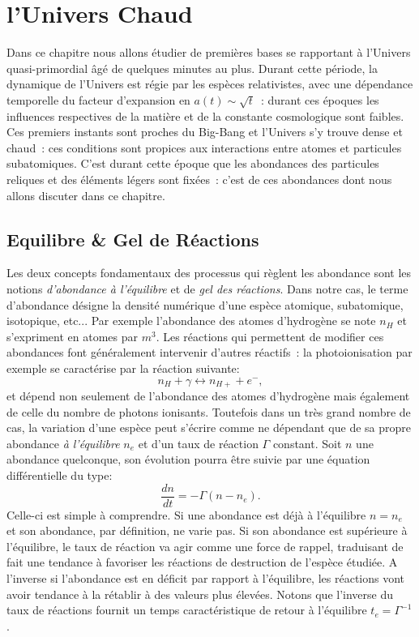 
\chapter{l'Univers Chaud}
Dans ce chapitre nous allons étudier de premières bases se rapportant à l'Univers quasi-primordial âgé de quelques minutes au plus. Durant cette période, la dynamique de l'Univers est régie par les espèces relativistes, avec une dépendance temporelle du facteur d'expansion en $a(t)\sim\sqrt{t}$~: durant ces époques les influences respectives de la matière et de la constante cosmologique sont faibles. Ces premiers instants sont proches du Big-Bang et l'Univers s'y trouve dense et chaud~: ces conditions sont propices aux interactions entre atomes et particules subatomiques. C'est durant cette époque que les abondances des particules reliques et des éléments légers sont fixées~: c'est de ces abondances dont nous allons discuter dans ce chapitre.

\section{Equilibre \& Gel de Réactions}
Les deux concepts fondamentaux des processus qui règlent les abondance sont les notions \textit{d'abondance à l'équilibre} et de \textit{gel des réactions}. Dans notre cas, le terme d'abondance désigne la densité numérique d'une espèce atomique, subatomique, isotopique, etc... Par exemple l'abondance des atomes d'hydrogène se note $n_H$ et s'expriment en atomes par $m^3$. Les réactions qui permettent de modifier ces abondances font généralement intervenir d'autres réactifs~: la photoionisation par exemple se caractérise par la réaction suivante:
\begin{equation}
n_H+\gamma \leftrightarrow n_{H+} + e^-,
\end{equation}
et dépend non seulement de l'abondance des atomes d'hydrogène mais également de celle du nombre de photons ionisants. Toutefois dans un très grand nombre de cas, la variation d'une espèce peut s'écrire comme ne dépendant que de sa propre abondance \textit{à l'équilibre} $n_e$ et d'un taux de réaction $\Gamma$ constant. Soit $n$ une abondance quelconque, son évolution pourra être suivie par une équation différentielle du type:
\begin{equation}
\frac{dn}{dt}=-\Gamma (n-n_e).
\end{equation}
Celle-ci est simple à comprendre. Si une abondance est déjà à l'équilibre $n=n_e$ et son abondance, par définition, ne varie pas. Si son abondance est supérieure à l'équilibre, le taux de réaction va agir comme une force de rappel, traduisant de fait une tendance à favoriser les réactions de destruction de l'espèce étudiée. A l'inverse si l'abondance est en déficit par rapport à l'équilibre, les réactions vont avoir tendance à la rétablir à des valeurs plus élevées. Notons que  l'inverse du taux de réactions fournit un temps caractéristique de retour à l'équilibre $t_e=\Gamma^{-1}$.

